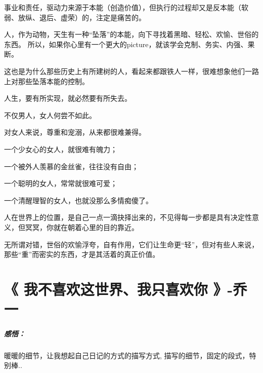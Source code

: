 \documentclass[UTF8,a4paper,8pt]{ctexart}
\begin{document}
 事业和责任，驱动力来源于本能（创造价值），但执行的过程却又是反本能（软弱、放纵、退后、虚荣）的，注定是痛苦的。
 
 人，作为动物，天生有一种“坠落”的本能，向下寻找着黑暗、轻松、欢愉、世俗的东西。 所以，如果你心里有一个更大的picture，就该学会克制、务实、内强、果断。
 
 这也是为什么那些历史上有所建树的人，看起来都跟铁人一样，很难想象他们一路上对那些坠落本能的控制。
 
 人生，要有所实现，就必然要有所失去。
 
 不仅男人，女人何尝不如此。
 
 对女人来说，尊重和宠溺，从来都很难兼得。
 
 一个少女心的女人，就很难有魄力；
 
 一个被外人羡慕的金丝雀，往往没有自由；
 
 一个聪明的女人，常常就很难可爱；
 
 一个清醒理智的女人，也就没那么多情痴傻了。
 
 人在世界上的位置，是自己一点一滴抉择出来的，不见得每一步都是具有决定性意义，但冥冥，你就在朝着心里的目的靠近。
 
 无所谓对错，世俗的欢愉浮夸，自有作用，它们让生命更“轻”，但对有些人来说，那些“重”而密实的东西，才是其活着的真正价值。 
 
 \newpage
 \section{《 我不喜欢这世界、我只喜欢你 》-乔一}
 \subparagraph{感悟：}暖暖的细节，让我想起自己日记的方式的描写方式, 描写的细节，固定的段式，特别棒..
 
\end{document}
